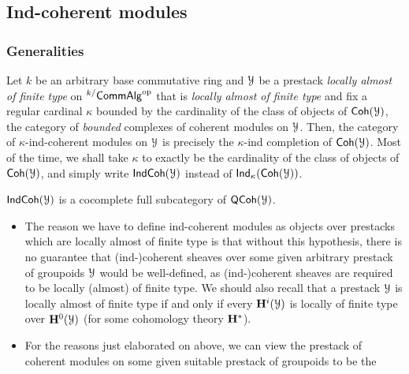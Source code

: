         \subsection{Ind-coherent modules}
            \subsubsection{Generalities}
                \begin{definition} \label{def: ind_coherent_modules}
                    Let $k$ be an arbitrary base commutative ring and $\mathcal{Y}$ be a prestack \textit{locally almost of finite type} on ${}^{k/}\mathsf{Comm}\mathsf{Alg}^{\mathrm{op}}$ that is \textit{locally almost of finite type} and fix a regular cardinal $\kappa$ bounded by the cardinality of the class of objects of $\mathsf{Coh}(\mathcal{Y})$, the category of \textit{bounded} complexes of coherent modules on $\mathcal{Y}$. Then, the category of $\kappa$-ind-coherent modules on $\mathcal{Y}$ is precisely the $\kappa$-ind completion of $\mathsf{Coh}(\mathcal{Y})$. Most of the time, we shall take $\kappa$ to exactly be the cardinality of the class of objects of $\mathsf{Coh}(\mathcal{Y})$, and simply write $\mathsf{Ind}\mathsf{Coh}(\mathcal{Y})$ instead of $\mathsf{Ind}_{\kappa}(\mathsf{Coh}(\mathcal{Y}))$. 
                \end{definition}
                \begin{remark} \label{remark: indcoh_is_cocomplete}
                    $\mathsf{Ind}\mathsf{Coh}(\mathcal{Y})$ is a cocomplete full subcategory of $\mathsf{QCoh}(\mathcal{Y})$.
                \end{remark}
                \begin{remark} \label{remark: ind_coherent_sheaves_why_almost_finite_type}
                    \noindent
                    \begin{itemize}
                        \item The reason we have to define ind-coherent modules as objects over prestacks which are locally almost of finite type is that without this hypothesis, there is no guarantee that (ind-)coherent sheaves over some given arbitrary prestack of groupoids $\mathcal{Y}$ would be well-defined, as (ind-)coherent sheaves are required to be locally (almost) of finite type. We should also recall that a prestack $\mathcal{Y}$ is locally almost of finite type if and only if every $\mathbf{H}^i(\mathcal{Y})$ is locally of finite type over $\mathbf{H}^0(\mathcal{Y})$ (for some cohomology theory $\mathbf{H}^*$).
                        \item For the reasons just elaborated on above, we can view the prestack of coherent modules on some given suitable prestack of groupoids to be the   
                    \end{itemize}
                \end{remark}
                
